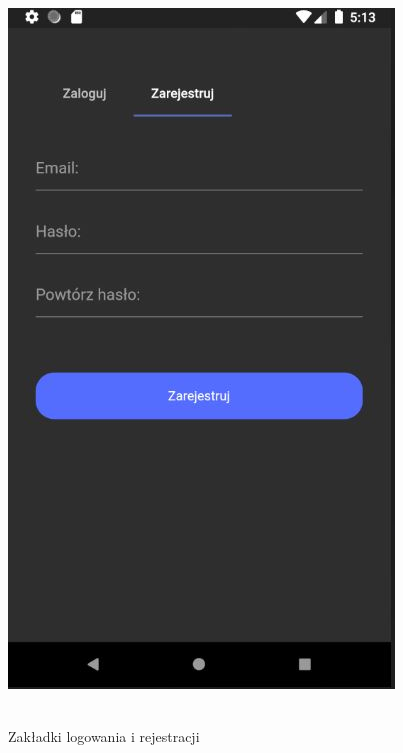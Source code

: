 \documentclass[12pt,a4paper]{article}
\begin{document}
\begin{center}
        \includegraphics[scale=0.70]{2.JPG}
            \begin{scriptsize}
            \\ Zakładki logowania i rejestracji
            \end{scriptsize}
    \end{center}
    
\end{document}
